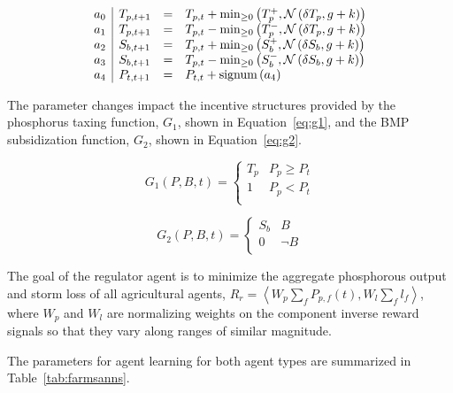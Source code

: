 \begin{equation}
    \label{eq:reg_shift}
    \begin{array}{l|lcl}
    a_0 & T_{p, t+1} & = & T_{p, t} 
        + \min_{\ge0}\left(T_p^+, \mathcal{N}\left(\delta T_p, g+k\right)\right) \\
    a_1 & T_{p, t+1} & = & T_{p, t} 
        - \min_{\ge0}\left(T_p^-, \mathcal{N}\left(\delta T_p, g+k\right)\right) \\
    a_2 & S_{b, t+1} & = & T_{p, t} 
        + \min_{\ge0}\left(S_b^+, \mathcal{N}\left(\delta S_b, g+k\right)\right) \\
    a_3 & S_{b, t+1} & = & T_{p, t} 
        - \min_{\ge0}\left(S_b^-, \mathcal{N}\left(\delta S_b, g+k\right)\right) \\
    a_4 & P_{t,t+1} & = & P_{t, t} 
        + \text{signum}\left(a_4\right) \\
    \end{array}
\end{equation}

The parameter changes impact the incentive structures
provided by the phosphorus taxing function, $G_1$,
shown in Equation~\ref{eq:g1},
and the BMP subsidization function, $G_2$,
shown in Equation~\ref{eq:g2}.

\begin{equation}
\label{eq:g1}
    G_1(P, B, t) = \left\{
    \begin{array}{ll}
        T_p & P_p \ge P_t \\
        1 & P_p < P_t \\
    \end{array}
    \right.
\end{equation}

\begin{equation}
\label{eq:g2}
    G_2(P, B, t) = \left\{
    \begin{array}{ll}
    S_b & B \\
    0 & \neg{B} \\
    \end{array}
    \right.
\end{equation}

The goal of the regulator agent is to minimize the aggregate phosphorous
output and storm loss of all agricultural agents,
$R_r = \left<W_p\sum_fP_{p,f}(t), W_l\sum_fl_f\right>$,
where $W_p$ and $W_l$ are normalizing weights on the component
inverse reward signals so that they vary along ranges of similar magnitude.

The parameters for agent learning for both agent types are summarized in
Table~\ref{tab:farmsanns}.

